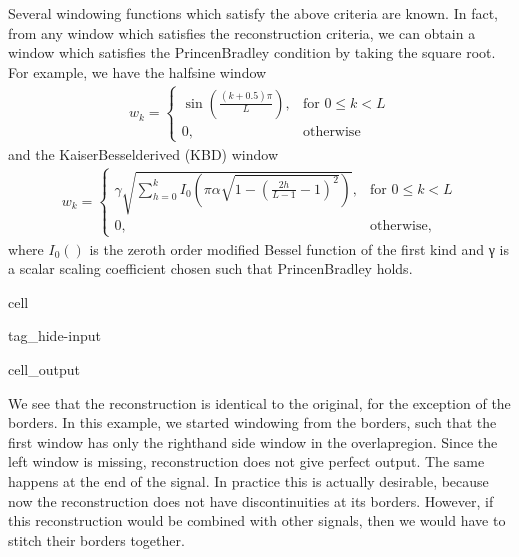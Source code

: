 \documentclass[letterpaper,10pt,english]{jupyterBook}
\begin{document}
\sphinxAtStartPar
Several windowing functions which satisfy the above criteria are known.
In fact, from any window which satisfies the reconstruction criteria, we
can obtain a window which satisfies the Princen\sphinxhyphen{}Bradley condition by
taking the square root. For example, we have  the half\sphinxhyphen{}sine window
\begin{equation*}
\begin{split} w_k = \begin{cases} \sin\left(\frac{(k+0.5)\pi}{L}\right), &
\textrm{for } 0\leq k  < L\\ 0, &\textrm{otherwise} \end{cases}
\end{split}
\end{equation*}
\sphinxAtStartPar
and the Kaiser\sphinxhyphen{}Bessel\sphinxhyphen{}derived (KBD) window
\begin{equation*}
\begin{split} w_k = \begin{cases} \gamma \sqrt{\sum_{h=0}^k
I_0\left(\pi\alpha \sqrt{1 -
\left(\frac{2h}{L-1}-1\right)^2}\right)}, & \textrm{for } 0\leq k
 < L\\ 0, &\textrm{otherwise}, \end{cases} \end{split}
\end{equation*}
\sphinxAtStartPar
where \(I_0()\) is the zeroth order modified Bessel function of
the first kind and γ is a scalar scaling coefficient chosen such that Princen\sphinxhyphen{}Bradley holds.

\begin{sphinxuseclass}{cell}
\begin{sphinxuseclass}{tag_hide-input}\begin{sphinxVerbatimOutput}

\begin{sphinxuseclass}{cell_output}
\noindent{}

\noindent{}

\noindent{}

\end{sphinxuseclass}\end{sphinxVerbatimOutput}

\end{sphinxuseclass}
\end{sphinxuseclass}
\sphinxAtStartPar
We see that the reconstruction is identical to the original, for the exception of the borders. In this example, we started windowing from the borders, such that the first window has only the right\sphinxhyphen{}hand side window in the overlap\sphinxhyphen{}region. Since the left window is missing, reconstruction does not give perfect output. The same happens at the end of the signal. In practice this is actually desirable, because now the reconstruction does not have discontinuities at its borders. However, if this reconstruction would be combined with other signals, then we would have to stitch their borders together.
\end{document}
